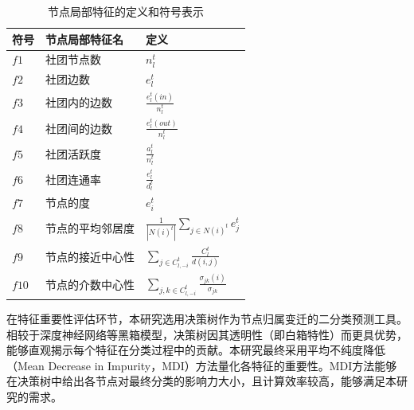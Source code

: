 \begin{table}[!htbp]
	
	\centering
	\caption{节点局部特征的定义和符号表示}\label{tab.3.1}
	\vspace{0.5em}\centering\wuhao
	\begin{tabular}{lll}
			\toprule[1.5pt]
			符号&节点局部特征名 & 定义\\
			\midrule[1.0pt]
			$f1$&社团节点数  & $n_l^t$\\
			$f2$&社团边数 & $e_l^t$\\
			$f3$&社团内的边数 & $\frac{e_l^t(in)}{n_l^t}$\\
			$f4$&社团间的边数&  $\frac{e_l^t(out)}{n_l^t}$\\
			$f5$&社团活跃度 & $\frac{a_l^t}{n_l^t}$\\
			$f6$&社团连通率 &  $\frac{e_l^t}{d_l^t}$\\
			$f7$&节点的度 & $e_i^t$ \\
			$f8$&节点的平均邻居度 &  $\frac{1}{|N(i)^t|}\sum_{j\in N(i)^t}e_j^t$ \\
			$f9$&节点的接近中心性 &  $\sum_{j\in C_{l,-i}^t}\frac{C_l^t}{d(i,j)}$ \\
			$f10$&节点的介数中心性 &  $\sum_{j,k \in C_{l,-i}^t}\frac{\sigma_{jk}(i)}{\sigma_{jk}}$\\
			\bottomrule[1.5pt]
		\end{tabular}
		
	\end{table}


在特征重要性评估环节，本研究选用决策树作为节点归属变迁的二分类预测工具。相较于深度神经网络等黑箱模型，决策树因其透明性（即白箱特性）而更具优势，能够直观揭示每个特征在分类过程中的贡献。本研究最终采用平均不纯度降低（Mean Decrease in Impurity，MDI）方法\cite{menze2009comparison}量化各特征的重要性。MDI方法能够在决策树中给出各节点对最终分类的影响力大小，且计算效率较高，能够满足本研究的需求。












